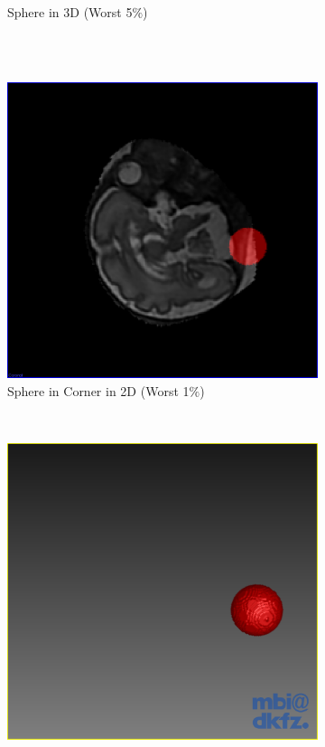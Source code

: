 \begin{figure}[H]
\begin{subfigure}[b]{0.5\textwidth}
    \caption{Sphere in 3D (Worst 5$\%$)}
    \label{fig:thresholdingresultssphere3d}
  \end{subfigure}\\[11pt]
  ~ %
  \begin{subfigure}[b]{0.5\textwidth}
    \includegraphics[width=\textwidth]{images/thresholding/results/sphere_corner_2d.png}
    \caption{Sphere in Corner in 2D (Worst 1$\%$)}
    \label{fig:thresholdingresultsspherecorner2d}
  \end{subfigure}%
  ~ %
  \begin{subfigure}[b]{0.5\textwidth}
    \includegraphics[width=\textwidth]{images/thresholding/results/sphere_corner_3d.png}

\end{subfigure}
\end{figure}
